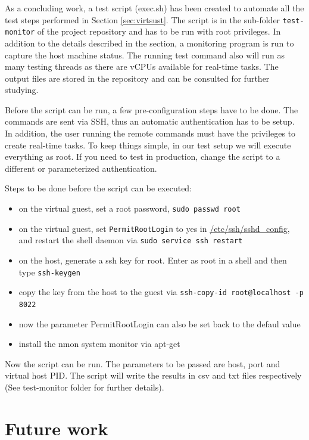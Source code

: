 \documentclass[]{scrartcl}
\begin{document}
As a concluding work, a test script (exec.sh) has been created to automate all the test steps performed in Section \ref{sec:virtsust}. The script is in the sub-folder \texttt{test-monitor} of the project repository \cite{gitrepo} and has to be run with root privileges.
In addition to the details described in the section, a monitoring program is run to capture the host machine status. The running test command also will run as many testing threads as there are vCPUs available for real-time tasks. The output files are stored in the repository and can be consulted for further studying.

Before the script can be run, a few pre-configuration steps have to be done. The commands are sent via SSH, thus an automatic authentication has to be setup. In addition, the user running the remote commands must have the privileges to create real-time tasks.
To keep things simple, in our test setup we will execute everything as root. If you need to test in production, change the script to a different or parameterized authentication.
\bigskip

Steps to be done before the script can be executed:

\begin{itemize}
	\item on the virtual guest, set a root password, \texttt{sudo passwd root}
	\item on the virtual guest, set \texttt{PermitRootLogin} to yes in \url{/etc/ssh/sshd_config}, and restart the shell daemon via \texttt{sudo service ssh restart}
	\item on the host, generate a ssh key for root. Enter as root in a shell and then type \texttt{ssh-keygen}
	\item copy the key from the host to the guest via \texttt{ssh-copy-id root@localhost -p 8022}
	\item now the parameter PermitRootLogin can also be set back to the defaul value
	\item install the nmon system monitor via apt-get
\end{itemize}

Now the script can be run. The parameters to be passed are host, port and virtual host PID. The script will write the results in csv and txt files respectively (See test-monitor folder for further details). 

\section{Future work}
\end{document}
